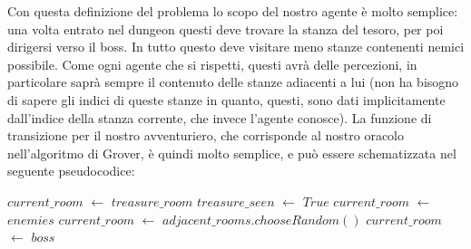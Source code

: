 \documentclass{book}
\newcommand*\Let[2]{\State #1 $\gets$ #2}
\theoremstyle{definition}
\theoremstyle{definition}
\theoremstyle{definition}
\theoremstyle{plain}
\theoremstyle{plain}
\theoremstyle{plain}
\theoremstyle{plain}
\begin{document}
Con questa definizione del problema lo scopo del nostro agente è molto semplice: una volta entrato nel dungeon questi deve trovare la stanza del tesoro, per poi dirigersi verso il boss. In tutto questo deve visitare meno stanze contenenti nemici possibile. Come ogni agente che si rispetti, questi avrà delle percezioni, in particolare saprà sempre il contenuto delle stanze adiacenti a lui (non ha bisogno di sapere gli indici di queste stanze in quanto, questi, sono dati implicitamente dall'indice della stanza corrente, che invece l'agente conosce). La funzione di transizione per il nostro avventuriero, che corrisponde al nostro oracolo nell'algoritmo di Grover, è quindi molto semplice, e può essere schematizzata nel seguente pseudocodice:
\begin{algorithm}[H]
\begin{algorithmic}[1]
        \Let{$current\_room$}{$treasure\_room$}
        \Let{$treasure\_seen$}{$True$}
        \Let{$current\_room$}{$enemies$}
        \Let{$current\_room$}{$adjacent\_rooms.chooseRandom()$}
        \Let{$current\_room$}{$boss$}
    \EndIf
\EndProcedure
\end{algorithmic}
\end{algorithm}

\end{document}
